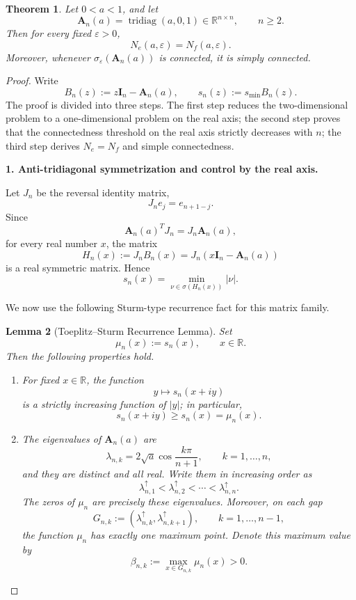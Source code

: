 \documentclass[11pt]{article}
\newtheorem{theorem}{Theorem}
\newtheorem{lemma}[theorem]{Lemma}
\DeclareMathOperator{\tridiag}{tridiag}
\newcommand{\R}{\mathbb R}
\newcommand{\eps}{\varepsilon}
\newcommand{\A}{\mathbf A}
\newcommand{\I}{\mathbf I}
\begin{document}
\begin{theorem}
Let \(0<a<1\), and let
\[
\A_n(a)=\tridiag(a,0,1)\in\R^{n\times n},\qquad n\ge 2.
\]
Then for every fixed \(\eps>0\),
\[
N_e(a,\eps)=N_f(a,\eps).
\]
Moreover, whenever \(\sigma_\eps(\A_n(a))\) is connected, it is simply connected.
\end{theorem}

\begin{proof}
Write
\[
B_n(z):=z\I_n-\A_n(a),\qquad
s_n(z):=s_{\min}B_n(z).
\]
The proof is divided into three steps. The first step reduces the two-dimensional problem to a one-dimensional problem on the real axis; the second step proves that the connectedness threshold on the real axis strictly decreases with \(n\); the third step derives \(N_e=N_f\) and simple connectedness.

\medskip

\noindent\textbf{1. Anti-tridiagonal symmetrization and control by the real axis.}

Let \(J_n\) be the reversal identity matrix,
\[
J_n e_j=e_{n+1-j}.
\]
Since
\[
\A_n(a)^T J_n=J_n\A_n(a),
\]
for every real number \(x\), the matrix
\[
H_n(x):=J_nB_n(x)=J_n(x\I_n-\A_n(a))
\]
is a real symmetric matrix. Hence
\[
s_n(x)=\min_{\nu\in\sigma(H_n(x))}|\nu|.
\tag{1}
\]

We now use the following Sturm-type recurrence fact for this matrix family.

\begin{lemma}[Toeplitz--Sturm Recurrence Lemma]
Set
\[
\mu_n(x):=s_n(x),\qquad x\in\R.
\]
Then the following properties hold.

\begin{enumerate}
\item For fixed \(x\in\R\), the function
\[
y\longmapsto s_n(x+iy)
\]
is a strictly increasing function of \(|y|\); in particular,
\[
s_n(x+iy)\ge s_n(x)=\mu_n(x).
\tag{2}
\]

\item The eigenvalues of \(\A_n(a)\) are
\[
\lambda_{n,k}=2\sqrt a\cos\frac{k\pi}{n+1},
\qquad k=1,\dots,n,
\tag{3}
\]
and they are distinct and all real. Write them in increasing order as
\[
\lambda_{n,1}^{\uparrow}<\lambda_{n,2}^{\uparrow}<\cdots<\lambda_{n,n}^{\uparrow}.
\]
The zeros of \(\mu_n\) are precisely these eigenvalues. Moreover, on each gap
\[
G_{n,k}:=(\lambda_{n,k}^{\uparrow},\lambda_{n,k+1}^{\uparrow}),
\qquad k=1,\dots,n-1,
\]
the function \(\mu_n\) has exactly one maximum point. Denote this maximum value by
\[
\beta_{n,k}:=\max_{x\in G_{n,k}}\mu_n(x)>0.
\tag{4}
\]


\end{enumerate}
\end{lemma}
\end{proof}
\end{document}

